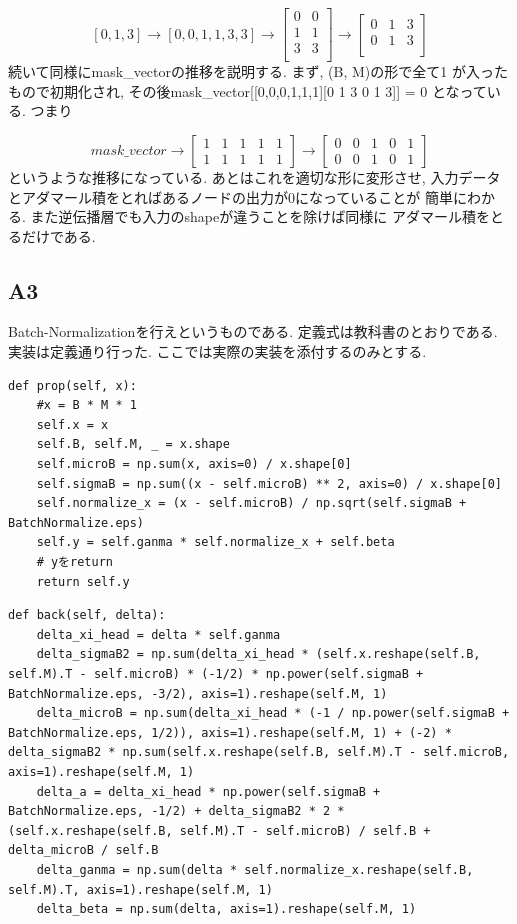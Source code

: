 \documentclass[a4paper,11pt]{jsarticle}
\begin{document}
$$
  [0, 1, 3] \rightarrow [0, 0, 1, 1, 3, 3] \rightarrow
  \begin{bmatrix}
    0 & 0 \\
    1 & 1 \\
    3 & 3 \\
  \end{bmatrix}
  \rightarrow \begin{bmatrix}
    0 & 1 & 3 \\
    0 & 1 & 3 \\
  \end{bmatrix}
$$
続いて同様にmask\_vectorの推移を説明する. まず, (B, M)の形で全て1
が入ったもので初期化され, その後mask\_vector[[0,0,0,1,1,1][0 1 3 0 1 3]] = 0
となっている. つまり

$$
  mask\_vector \rightarrow \begin{bmatrix}
    1 & 1 & 1 & 1 & 1 \\
    1 & 1 & 1 & 1 & 1
  \end{bmatrix} \rightarrow
  \begin{bmatrix}
    0 & 0 & 1 & 0 & 1 \\
    0 & 0 & 1 & 0 & 1
  \end{bmatrix}
$$
というような推移になっている. あとはこれを適切な形に変形させ,
入力データとアダマール積をとればあるノードの出力が0になっていることが
簡単にわかる. また逆伝播層でも入力のshapeが違うことを除けば同様に
アダマール積をとるだけである.
\subsection{A3}
Batch-Normalizationを行えというものである.
定義式は教科書のとおりである. 実装は定義通り行った.
ここでは実際の実装を添付するのみとする.
\begin{lstlisting}[caption=Batch-Normalization-prop]
  def prop(self, x):
    #x = B * M * 1
    self.x = x
    self.B, self.M, _ = x.shape
    self.microB = np.sum(x, axis=0) / x.shape[0]
    self.sigmaB = np.sum((x - self.microB) ** 2, axis=0) / x.shape[0]
    self.normalize_x = (x - self.microB) / np.sqrt(self.sigmaB + BatchNormalize.eps)
    self.y = self.ganma * self.normalize_x + self.beta
    # yをreturn
    return self.y
\end{lstlisting}

\begin{lstlisting}[caption=Batch-Normalization-back]
  def back(self, delta):
    delta_xi_head = delta * self.ganma
    delta_sigmaB2 = np.sum(delta_xi_head * (self.x.reshape(self.B, self.M).T - self.microB) * (-1/2) * np.power(self.sigmaB + BatchNormalize.eps, -3/2), axis=1).reshape(self.M, 1)
    delta_microB = np.sum(delta_xi_head * (-1 / np.power(self.sigmaB + BatchNormalize.eps, 1/2)), axis=1).reshape(self.M, 1) + (-2) * delta_sigmaB2 * np.sum(self.x.reshape(self.B, self.M).T - self.microB, axis=1).reshape(self.M, 1)
    delta_a = delta_xi_head * np.power(self.sigmaB + BatchNormalize.eps, -1/2) + delta_sigmaB2 * 2 * (self.x.reshape(self.B, self.M).T - self.microB) / self.B + delta_microB / self.B
    delta_ganma = np.sum(delta * self.normalize_x.reshape(self.B, self.M).T, axis=1).reshape(self.M, 1)
    delta_beta = np.sum(delta, axis=1).reshape(self.M, 1)
\end{lstlisting}
\end{document}
